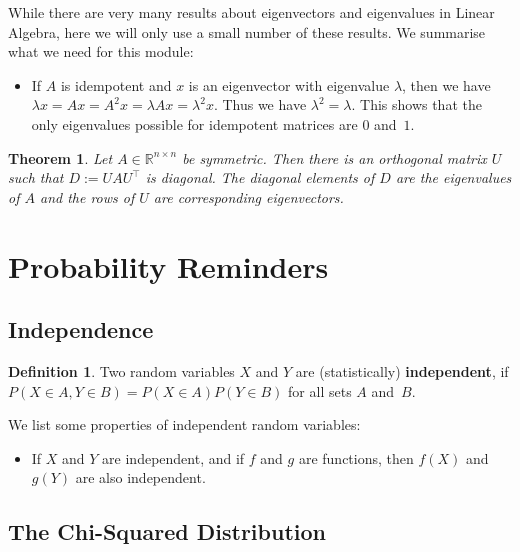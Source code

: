 \documentclass[
  a4paper,
]{article}
\providecommand{\tightlist}{%
  \setlength{\itemsep}{0pt}\setlength{\parskip}{0pt}}
\newtheorem{theorem}{Theorem}[section]
\theoremstyle{definition}
\newtheorem{definition}{Definition}[section]
\theoremstyle{definition}
\theoremstyle{definition}
\theoremstyle{definition}
\theoremstyle{remark}
\begin{document}
While there are very many results about eigenvectors and eigenvalues
in Linear Algebra, here we will only use a small number of these results.
We summarise what we need for this module:

\begin{itemize}
\tightlist
\item
  If \(A\) is idempotent and \(x\) is an eigenvector with eigenvalue \(\lambda\),
  then we have \(\lambda x = A x = A^2 x = \lambda Ax = \lambda^2 x\). Thus we
  have \(\lambda^2 = \lambda\). This shows that the only eigenvalues possible
  for idempotent matrices are \(0\) and~\(1\).
\end{itemize}

\begin{theorem}
\protect\hypertarget{thm:spectral}{}\label{thm:spectral}Let \(A\in\mathbb{R}^{n\times n}\) be symmetric. Then there is an orthogonal
matrix \(U\) such that \(D := U A U^\top\) is diagonal. The diagonal
elements of \(D\) are the eigenvalues of \(A\) and the rows of \(U\)
are corresponding eigenvectors.
\end{theorem}

\clearpage

\hypertarget{Sx2-probability}{%
\section{Probability Reminders}\label{Sx2-probability}}

\hypertarget{independence}{%
\subsection{Independence}\label{independence}}

\begin{definition}
Two random variables \(X\) and \(Y\) are (statistically) \textbf{independent}, if
\(P(X\in A, Y\in B) = P(X\in A) P(Y\in B)\) for all sets \(A\) and~\(B\).
\end{definition}

We list some properties of independent random variables:

\begin{itemize}
\tightlist
\item
  If \(X\) and \(Y\) are independent, and if \(f\) and \(g\) are functions,
  then \(f(X)\) and \(g(Y)\) are also independent.
\end{itemize}

\hypertarget{chi-square}{%
\subsection{The Chi-Squared Distribution}\label{chi-square}}
\end{document}
